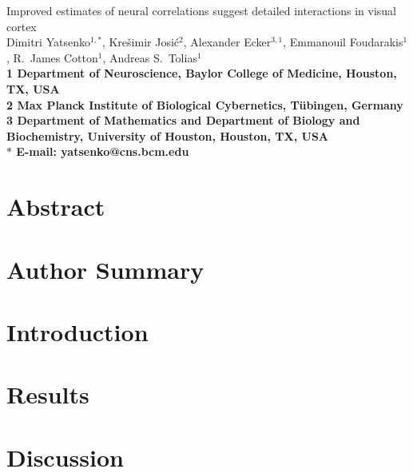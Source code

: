 \documentclass[10pt]{article}
\date{}
\begin{document}
\begin{flushleft}
{\Large
Improved estimates of neural correlations suggest detailed interactions in visual cortex
}
\\
Dimitri Yatsenko$^{1,\ast}$, 
Kre\v{s}imir Josi\'{c}$^{2}$,
Alexander Ecker$^{3,1}$,
Emmanouil Foudarakis$^{1}$,
R.~James Cotton$^{1}$,
Andreas S.~Tolias$^{1}$
\\
\bf{1} Department of Neuroscience, Baylor College of Medicine, Houston, TX, USA
\\
\bf{2} Max Planck Institute of Biological Cybernetics, T\"ubingen, Germany
\\
\bf{3} Department of Mathematics and Department of Biology and Biochemistry, University of Houston, Houston, TX, USA
\\
$\ast$ E-mail: yatsenko@cns.bcm.edu
\end{flushleft}

\section*{Abstract}


\section*{Author Summary}


\section*{Introduction}


\section*{Results}








\section*{Discussion}

\end{document}
